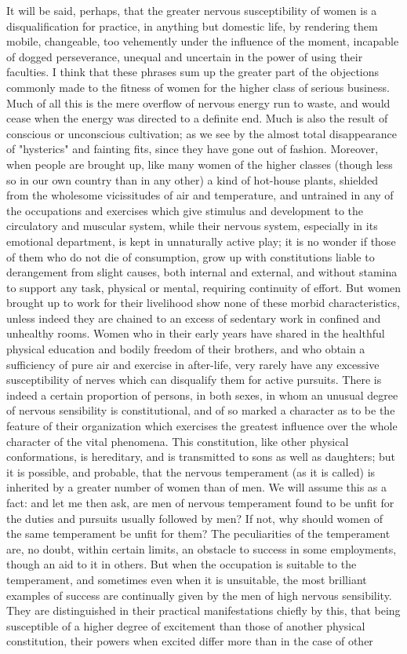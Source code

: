 \documentclass[12pt]{report}
\begin{document}
It will be said, perhaps, that the greater nervous susceptibility of women is a disqualification for practice, in anything but domestic life, by rendering them mobile, changeable, too vehemently under the influence of the moment, incapable of dogged perseverance, unequal and uncertain in the power of using their faculties. I think that these phrases sum up the greater part of the objections commonly made to the fitness of women for the higher class of serious business. Much of all this is the mere overflow of nervous energy run to waste, and would cease when the energy was directed to a definite end. Much is also the result of conscious or unconscious cultivation; as we see by the almost total disappearance of "hysterics" and fainting fits, since they have gone out of fashion. Moreover, when people are brought up, like many women of the higher classes (though less so in our own country than in any other) a kind of hot-house plants, shielded from the wholesome vicissitudes of air and temperature, and untrained in any of the occupations and exercises which give stimulus and development to the circulatory and muscular system, while their nervous system, especially in its emotional department, is kept in unnaturally active play; it is no wonder if those of them who do not die of consumption, grow up with constitutions liable to derangement from slight causes, both internal and external, and without stamina to support any task, physical or mental, requiring continuity of effort. But women brought up to work for their livelihood show none of these morbid characteristics, unless indeed they are chained to an excess of sedentary work in confined and unhealthy rooms. Women who in their early years have shared in the healthful physical education and bodily freedom of their brothers, and who obtain a sufficiency of pure air and exercise in after-life, very rarely have any excessive susceptibility of nerves which can disqualify them for active pursuits. There is indeed a certain proportion of persons, in both sexes, in whom an unusual degree of nervous sensibility is constitutional, and of so marked a character as to be the feature of their organization which exercises the greatest influence over the whole character of the vital phenomena. This constitution, like other physical conformations, is hereditary, and is transmitted to sons as well as daughters; but it is possible, and probable, that the nervous temperament (as it is called) is inherited by a greater number of women than of men. We will assume this as a fact: and let me then ask, are men of nervous temperament found to be unfit for the duties and pursuits usually followed by men? If not, why should women of the same temperament be unfit for them? The peculiarities of the temperament are, no doubt, within certain limits, an obstacle to success in some employments, though an aid to it in others. But when the occupation is suitable to the temperament, and sometimes even when it is unsuitable, the most brilliant examples of success are continually given by the men of high nervous sensibility. They are distinguished in their practical manifestations chiefly by this, that being susceptible of a higher degree of excitement than those of another physical constitution, their powers when excited differ more than in the case of other 
\end{document}
